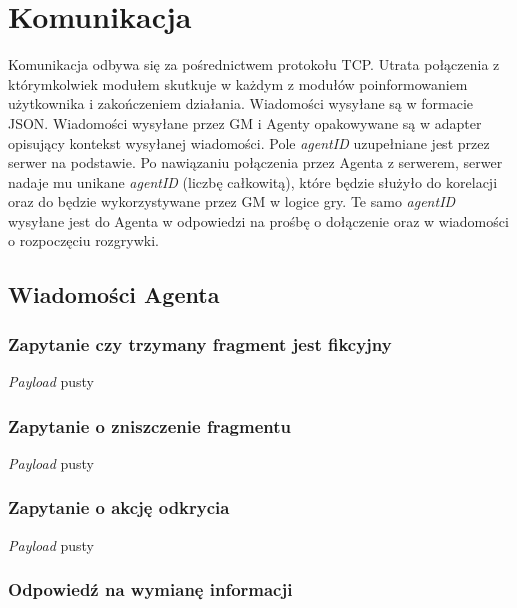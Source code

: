 \documentclass[Dokumentacja.tex]{subfiles}
\begin{document}
\section{Komunikacja}
\label{sec:komunikacja}

Komunikacja odbywa się za pośrednictwem protokołu TCP. Utrata połączenia z którymkolwiek modułem skutkuje w każdym z modułów
poinformowaniem użytkownika i zakończeniem działania. Wiadomości wysyłane są w formacie JSON.
Wiadomości wysyłane przez GM i Agenty opakowywane są w adapter opisujący kontekst wysyłanej wiadomości.
Pole \textit{agentID} uzupełniane jest przez serwer na podstawie. Po nawiązaniu połączenia przez Agenta z serwerem,
serwer nadaje mu unikane \textit{agentID} (liczbę całkowitą), które będzie służyło do korelacji oraz do będzie
wykorzystywane przez GM w logice gry. Te samo \textit{agentID} wysyłane jest do Agenta w odpowiedzi na prośbę o dołączenie
oraz w wiadomości o rozpoczęciu rozgrywki.



\subsection{Wiadomości Agenta}
\subsubsection{Zapytanie czy trzymany fragment jest fikcyjny}
\textit{Payload} pusty


\subsubsection{Zapytanie o zniszczenie fragmentu}
\textit{Payload} pusty


\subsubsection{Zapytanie o akcję odkrycia}
\textit{Payload} pusty


\subsubsection{Odpowiedź na wymianę informacji}

\end{document}
